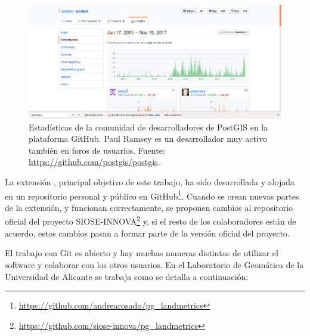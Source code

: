 \begin{figure}
\includegraphics[width=\textwidth]{Metodologia/Figs/postgis-github}
\caption{Estadísticas de la comunidad de desarrolladores de PostGIS en la plataforma GitHub. Paul Ramsey es un desarrollador muy activo también en foros de usuarios. Fuente: \url{https://github.com/postgis/postgis}. \label{fig:postgis-github}}
\end{figure}

La extensión \pgland{}, principal objetivo de este trabajo, ha sido desarrollada y alojada en un repositorio personal y público en GitHub\footnote{\url{https://github.com/andrearosado/pg_landmetrics}}. Cuando se crean nuevas partes de la extensión, y funcionan correctamente, se proponen cambios al repositorio oficial del proyecto SIOSE-INNOVA\footnote{\url{https://github.com/siose-innova/pg_landmetrics}} y, si el resto de los colaboradores están de acuerdo, estos cambios pasan a formar parte de la versión oficial del proyecto.

El trabajo con Git es abierto y hay muchas maneras distintas de utilizar el software y colaborar con los otros usuarios. En el Laboratorio de Geomática de la Universidad de Alicante se trabaja como se detalla a continuación:

